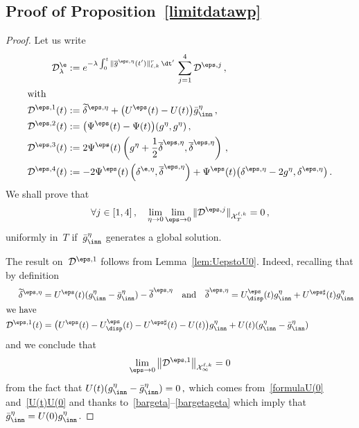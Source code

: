 \subsection{Proof of Proposition~\ref{limitdatawp}} \label{sec:Deps}
\begin{proof}
Let us write
\begin{align*}
\mathcal{D}_\lambda^{\e} & :=e^{-\lambda \int_0^t \|\overline g^{\eps,\eta}(t')\|_{\ell,k}^r\, \dt' \, } \sum_{j=1}^4 {\mathcal D} ^{\eps,j} \,,\\
\intertext{with}
{\mathcal D} ^{\eps,1}(t) & := \widetilde \delta^{\eps,\eta} + \big(U^\eps (t) - U (t)\big){\bar g_{{\inn}}^\eta} \,, \\
{\mathcal D} ^{\eps,2}(t) & := \big(\Psi^\eps (t) - \Psi(t) \big) (g^\eta,g^\eta) \,,\\
{\mathcal D} ^{\eps,3}(t) & :=2 \Psi^\eps (t) \left({g^\eta+\frac 12 \overline\delta^{\eps,\eta}}, \overline\delta^{\eps,\eta}\right) \,, \\
{\mathcal D} ^{\eps,4}(t) & :=- 2\Psi^\eps (t) \left(\delta^{\e,\eta}, \overline\delta^{\eps,\eta}\right) +\Psi^\eps (t)
\big(\delta^{\eps,\eta} -2{g^\eta}, \delta^{\eps,\eta}
\big)
\,.
\end{align*}
We shall prove that
\[
\forall j \in [1,4] \,, \quad \lim_{\eta\to0} \lim_{\eps\to0} \| {\mathcal D} ^{\eps,j}\|_{\mathcal{X}_T^{\ell,k}} = 0 \,,
\]
uniformly in~$T$ if~$\bar g^\eta_{\inn}$ generates a global solution.

The result on~$ {\mathcal D}^{\eps,1}$ follows from Lemma~\ref{lem:UepstoU0}. Indeed, recalling that by definition
\begin{align*}
\widetilde \delta^{\eps,\eta} &= U^\eps(t) (g_{\inn}^\eta - \bar g^\eta_{{\inn}}) - \overline\delta^{\eps,\eta}
\quad \text{and}\quad \overline\delta^{\eps,\eta} = U^\eps_{\disp}(t) g^\eta_{{\inn}} + U^{\eps \sharp}(t)g^\eta_{{\inn}}\\
\intertext{we have}
{\mathcal D} ^{\eps,1}(t) &= \big(U^\eps (t) - U^\eps_{\disp}(t) - U^{\eps \sharp}(t)- U (t)\big) g^\eta_{{\inn}} + U (t) (g_{\inn}^\eta - \bar g^\eta_{{\inn}})
\end{align*}
and we conclude that
\[
\lim_{\eps\to0} \left\| {\mathcal D} ^{\eps,1} \right\|_{\mathcal{X}_\infty^{\ell,k}} = 0
\]
from the fact that {$ U (t) (g_{\inn}^\eta - \bar g^\eta_{{\inn}}) = 0 \,, $ which comes from~\eqref{formulaU(0} and~\eqref{U(t)U(0} and thanks to~\eqref{bargeta}--\eqref{bargetageta} which imply that~$\bar g^\eta_{{\inn}} = U(0) g^\eta_{{\inn}}$.}


\end{proof}

